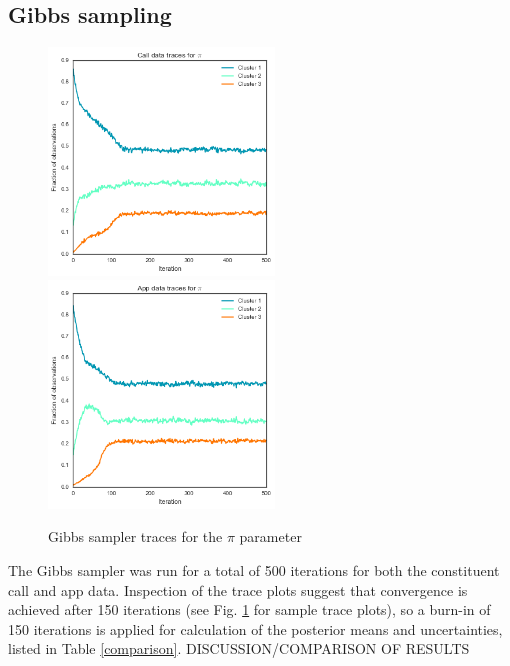 \documentclass[twoside]{article}
\theoremstyle{theorem}
\theoremstyle{theorem}
\theoremstyle{theorem}
\theoremstyle{lemma}
\theoremstyle{definition}
\theoremstyle{example}
\begin{document}
\subsection{Gibbs sampling}
\begin{figure}
\begin{center}
\includegraphics[width=60mm]{calldatapitrace}
\includegraphics[width=60mm]{appdatapitrace}
\caption{Gibbs sampler traces for the $\pi$ parameter}
\label{trace}
\end{center}
\end{figure}

The Gibbs sampler was run for a total of 500 iterations for both the constituent call and app data. Inspection of the trace plots suggest that convergence is achieved after 150 iterations (see Fig. \ref{trace} for sample trace plots), so a burn-in of 150 iterations is applied for calculation of the posterior means and uncertainties, listed in Table \ref{comparison}.
DISCUSSION/COMPARISON OF RESULTS
\end{document}
